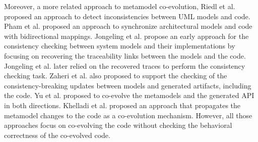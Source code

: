 Moreover, a more related approach to metamodel co-evolution, Riedl et al. \cite{riedl2014towards} proposed an approach to detect inconsistencies between UML models and code. %
Pham et al. \cite{pham2017bidirectional} proposed an approach to synchronize architectural models and code with bidirectional mappings.
%
Jongeling et al. \cite{jongeling2020towards} propose an early approach for the consistency checking between system models and their implementations by focusing on recovering the traceability links between the models and the code. Jongeling et al. \cite{jongeling2022Structural} later relied on the recovered traces to perform the consistency checking task.  %
%
Zaheri et al. \cite{zaheri2021towards} also proposed to support the checking of the consistency-breaking updates between models and generated artifacts, including the code. %
%
Yu et al. \cite{yu2012maintaining} proposed to co-evolve the metamodels and the generated API in both directions. %
%
Khelladi et al. \cite{Khelladi2020} proposed an approach that propagates the metamodel changes to the code as a co-evolution mechanism. %
%
However, all those approaches \cite{riedl2014towards,pham2017bidirectional,jongeling2020towards,jongeling2022Structural,zaheri2021towards,yu2012maintaining,Khelladi2020} focus on co-evolving the code without checking the behavioral correctness of the co-evolved code. 

